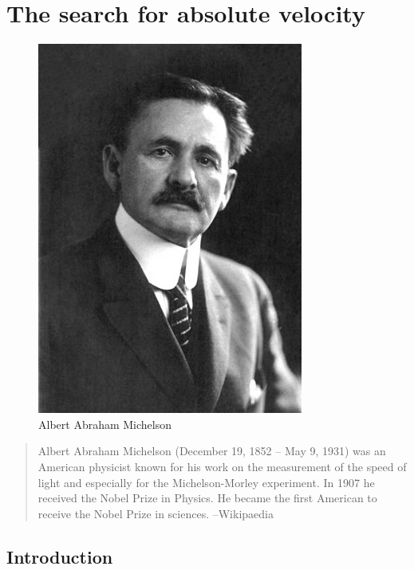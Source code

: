 \chapter{The search for absolute velocity}


\newpage

\thispagestyle{empty}
\begin{figure}[H]
\centering
\includegraphics[scale=.5]{src/images/lbk-graphics/portraits/michelson-wiki.jpg}
\caption*{Albert Abraham Michelson}
\end{figure}
\begin{small}
\begin{quote}
Albert Abraham Michelson (December 19, 1852 -- May 9, 1931) 
was an American physicist known for his work on the 
measurement of the speed of light and especially for the 
Michelson-Morley experiment. In 1907 he received the Nobel 
Prize in Physics. He became the first American to receive 
the Nobel Prize in sciences.
\hfill --Wikipaedia
\end{quote}
\end{small}
\newpage


\section{Introduction}


